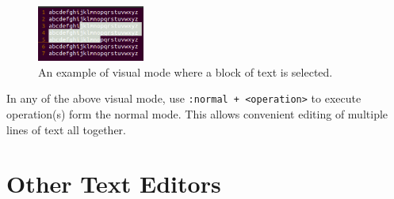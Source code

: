 \begin{figure}
	\centering
	\includegraphics[width=100pt]{chapters/chapter3/figures/vimvm1.png}
	\caption{An example of visual mode where a block of text is selected.} \label{ch3fig:vimvm1}
\end{figure}

In any of the above visual mode, use \verb|:normal + <operation>| to execute operation(s) form the normal mode. This allows convenient editing of multiple lines of text all together.

\section{Other Text Editors}




